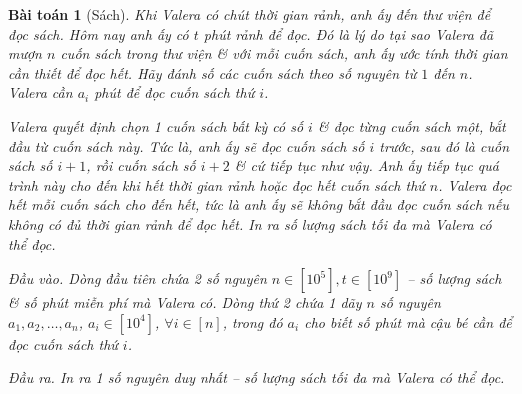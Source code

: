 \documentclass{article}
\newtheorem{baitoan}{Bài toán}
\begin{document}
\begin{baitoan}[Sách]
    Khi Valera có chút thời gian rảnh, anh ấy đến thư viện để đọc sách. Hôm nay anh ấy có $t$ phút rảnh để đọc. Đó là lý do tại sao Valera đã mượn $n$ cuốn sách trong thư viện \& với mỗi cuốn sách, anh ấy ước tính thời gian cần thiết để đọc hết. Hãy đánh số các cuốn sách theo số nguyên từ $1$ đến $n$. Valera cần $a_i$ phút để đọc cuốn sách thứ $i$.

    Valera quyết định chọn 1 cuốn sách bất kỳ có số $i$ \& đọc từng cuốn sách một, bắt đầu từ cuốn sách này. Tức là, anh ấy sẽ đọc cuốn sách số $i$ trước, sau đó là cuốn sách số $i + 1$, rồi cuốn sách số $i + 2$ \& cứ tiếp tục như vậy. Anh ấy tiếp tục quá trình này cho đến khi hết thời gian rảnh hoặc đọc hết cuốn sách thứ $n$. Valera đọc hết mỗi cuốn sách cho đến hết, tức là anh ấy sẽ không bắt đầu đọc cuốn sách nếu không có đủ thời gian rảnh để đọc hết. In ra số lượng sách tối đa mà Valera có thể đọc.
    \item {\sf Đầu vào.} Dòng đầu tiên chứa 2 số nguyên $n\in[10^5],t\in[10^9]$ -- số lượng sách \& số phút miễn phí mà Valera có. Dòng thứ 2 chứa 1 dãy $n$ số nguyên $a_1,a_2,\ldots,a_n$, $a_i\in[10^4]$, $\forall i\in[n]$, trong đó $a_i$ cho biết số phút mà cậu bé cần để đọc cuốn sách thứ $i$.
    \item {\sf Đầu ra.} In ra 1 số nguyên duy nhất -- số lượng sách tối đa mà Valera có thể đọc.
\end{baitoan}
\end{document}
